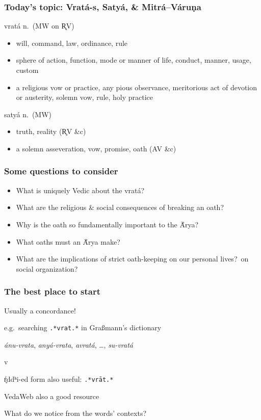 \documentclass[pdf]{beamer}
\newcommand{\Subitem}[1]{{\setlength\itemindent{12pt} \item[-] #1}}
\begin{document}
\begin{frame} \frametitle{Today's topic: Vratá-s, Satyá, \& Mitrá--Váruṇa}
\begin{block} {vratá n.~(MW on R̥V)}
\begin{itemize}
	\item will, command, law, ordinance, rule
	\item sphere of action, function, mode or manner of life, conduct, manner, usage, custom
	\item a religious vow or practice, any pious observance, meritorious act of devotion or austerity, solemn vow, rule, holy practice
\end{itemize}
\end{block}
\pause
\begin{block} {satyá n.~(MW)}
\begin{itemize}
	\item truth, reality (R̥V \&c)
	\item a solemn asseveration, vow, promise, oath (AV \&c)
\end{itemize}
\end{block}
\end{frame}

\begin{frame}[label=questions] \frametitle{Some questions to consider}
\begin{itemize}
	\item What is uniquely Vedic about the vratá?
	\item What are the religious \& social consequences of breaking an oath?
	\item Why is the oath so fundamentally important to the Ā́rya?
	\item What oaths must an Ā́rya make?
	\item What are the implications of strict oath-keeping on our personal lives?~on social organization?
\end{itemize}
\end{frame}

\begin{frame} \frametitle{The best place to start}
\begin{itemize}
	\item Usually a concordance!
	\item e.g.~searching \texttt{.*vrat.*} in Graßmann's dictionary
	\Subitem {\textit{ánu-vrata}, \textit{anyá-vrata}, \textit{avratá}, \ldots, \textit{su-vratá}}
	\Subitem vŕ̥ddʰi-ed form also useful: \texttt{.*vrāt.*}
	\item VedaWeb also a good resource
	\item What do we notice from the words' contexts?
\end{itemize}
\end{frame}
\end{document}
